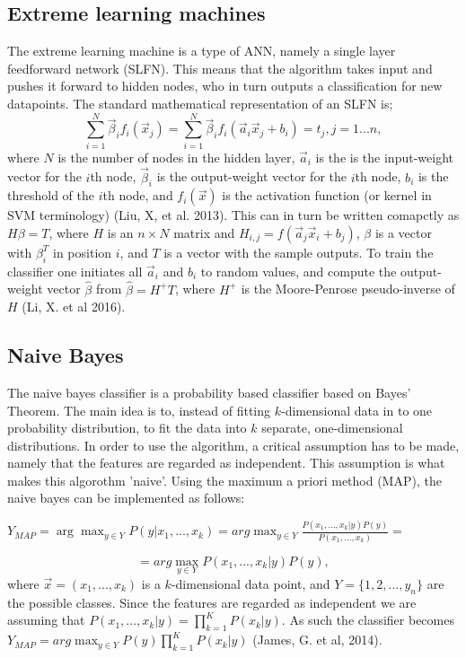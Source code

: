 \documentclass{article}
\begin{document}
\subsection{Extreme learning machines}
The extreme learning machine is a type of ANN, namely a single layer feedforward network (SLFN). This means that the algorithm takes input and pushes it forward to hidden nodes, who in turn outputs a classification for new datapoints. The standard mathematical representation of an SLFN is;
\begin{equation}
\sum\limits_{i = 1}^N \vec{\beta}_i f_i (\vec{x}_j)  = \sum\limits_{i = 1}^N \vec{\beta}_i f_i (\vec{a}_i  \vec{x}_j + b_i)= t_j, j = 1...n, 
\end{equation}
where $N$ is the number of nodes in the hidden layer, $\vec{a}_i$ is the is the input-weight vector for the $i$th node, $\vec{\beta}_i$ is the output-weight vector for the $i$th node, $b_i$ is the threshold of the $i$th node, and $f_i(\vec{x})$ is the activation function (or kernel in SVM terminology) (Liu, X, et al. 2013). This can in turn be written comapctly as $H\beta = T$, where $H$ is an $n \times N$ matrix and $H_{i, j} = f(\vec{a}_j\vec{x}_i + b_j)$, $\beta$ is a vector with $\beta_i^T$ in position $i$, and $T$ is a vector with the sample outputs. To train the classifier one initiates all $\vec{a}_i$ and $b_i$ to random values, and compute the output-weight vector $\hat{\beta}$ from $\hat\beta = H^+ T$, where $H^+$ is the Moore-Penrose pseudo-inverse of $H$ (Li, X. et al 2016).

\subsection{Naive Bayes}
The naive bayes classifier is a probability based classifier based on Bayes' Theorem. The main idea is to, instead of fitting $k$-dimensional data in to one probability distribution, to fit the data into $k$ separate, one-dimensional  distributions. In order to use the algorithm, a critical assumption has to be made, namely that the features are regarded as independent. This assumption is what makes this algorothm 'naive'. Using the maximum a priori method (MAP), the naive bayes can be implemented as follows:
\begin{center}
$Y_{MAP} = \arg \max_{y \in Y} P(y | x_1, ..., x_k) = arg \max_{y \in Y} \frac{ P( x_1, ..., x_k | y)P(y) }{P(x_1, ..., x_k)}=$
\end{center}
\begin{equation}
 = arg \max_{y \in Y} P(x_1, ..., x_k|y)P(y) ,
\end{equation}
where $\vec{x} = (x_1, ..., x_k)$ is a $k$-dimensional data point, and $Y = \{1, 2, ...,y_n\}$ are the possible classes. Since the features are regarded as independent we are assuming that $P(x_1, ..., x_k| y) = \prod_{k=1}^{K} P(x_k |y).$ As such the classifier becomes $Y_{MAP} = arg \max_{y \in Y} P(y)\prod_{k=1}^{K}P(x_k|y)$ (James, G. et al, 2014).
\end{document}
